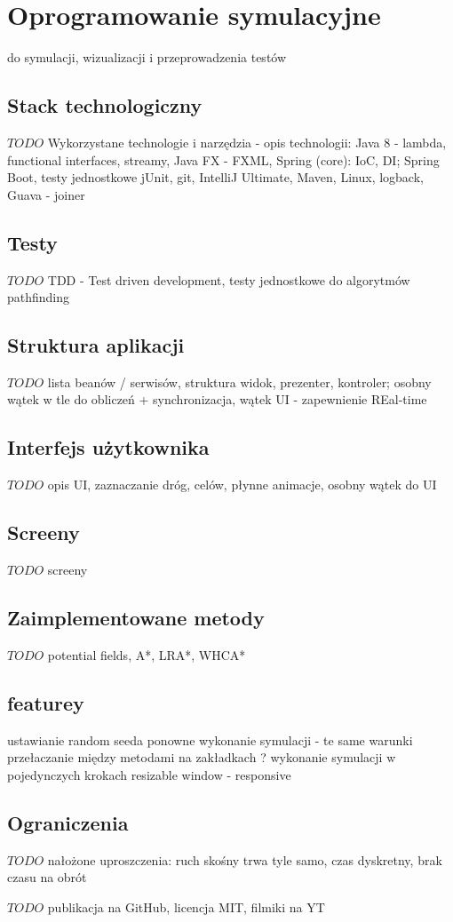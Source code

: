 \chapter{Oprogramowanie symulacyjne}
\label{ch:simulation-app}

do symulacji, wizualizacji i przeprowadzenia testów

\section{Stack technologiczny}
$TODO$ Wykorzystane technologie i narzędzia - opis technologii:
Java 8 - lambda, functional interfaces, streamy,
Java FX - FXML, Spring (core): IoC, DI; Spring Boot, testy jednostkowe jUnit, git, IntelliJ Ultimate, Maven, Linux, logback, Guava - joiner

\section{Testy}
$TODO$ TDD - Test driven development, testy jednostkowe do algorytmów pathfinding

\section{Struktura aplikacji}
$TODO$ lista beanów / serwisów, struktura widok, prezenter, kontroler; osobny wątek w tle do obliczeń + synchronizacja, wątek UI - zapewnienie REal-time

\section{Interfejs użytkownika}
$TODO$ opis UI, zaznaczanie dróg, celów, płynne animacje, osobny wątek do UI

\section{Screeny}
$TODO$ screeny

\section{Zaimplementowane metody}
$TODO$ potential fields, A*, LRA*, WHCA*

\section{featurey}
ustawianie random seeda
ponowne wykonanie symulacji - te same warunki
przełaczanie między metodami na zakładkach ?
wykonanie symulacji w pojedynczych krokach
resizable window - responsive

\section{Ograniczenia}
$TODO$ nałożone uproszczenia: ruch skośny trwa tyle samo, czas dyskretny, brak czasu na obrót

$TODO$ publikacja na GitHub, licencja MIT, filmiki na YT